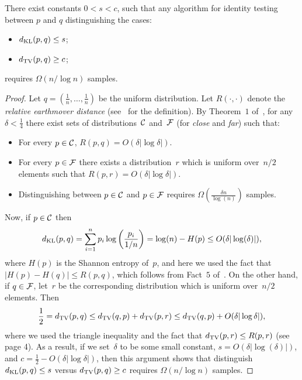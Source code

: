 \begin{theorem}\label{thm:ones-lb}
There exist constants $0 < s < c$, such that any algorithm for identity testing between $p$ and $q$ distinguishing the cases:
\begin{itemize}
\item $d_{\mathrm {KL}}(p,q) \leq s$;
\item $d_{\mathrm {TV}}(p,q) \geq c$;
\end{itemize}
requires $\Omega(n/\log n)$ samples.
\end{theorem}
\begin{proof}
Let $q = (\tfrac{1}{n}, \ldots, \tfrac{1}{n})$ be the uniform distribution.
Let $R(\cdot, \cdot)$ denote the \emph{relative earthmover distance} (see~\cite{ValiantV10a} for the definition).
By Theorem~$1$ of~\cite{ValiantV10a},
for any $\delta < \frac{1}{4}$
there exist sets of distributions~$\mathcal{C}$ and~$\mathcal{F}$ (for \emph{close} and \emph{far})
such that:
\begin{itemize}
\item For every $p \in \mathcal{C}$, $R(p, q) = O(\delta | \log \delta|)$.
\item For every $p \in \mathcal{F}$ there exists a distribution~$r$ which is uniform over~$n/2$ elements such that $R(p, r) = O(\delta | \log \delta|)$.
\item Distinguishing between $p \in \mathcal{C}$ and $p \in \mathcal{F}$ requires $\Omega(\frac{\delta n}{\log(n)})$ samples.
\end{itemize}
Now, if $p \in \mathcal{C}$ then
\begin{equation*}
d_{\mathrm {KL}}(p,q)
= \sum_{i=1}^n p_i \log\left(\frac{p_i}{1/n}\right)
= \log(n) - H(p)
\leq O(\delta |\log(\delta)|),
\end{equation*}
where $H(p)$ is the Shannon entropy of~$p$,
and here we used the fact that $|H(p) - H(q)| \leq R(p, q)$, which follows from Fact~$5$ of~\cite{ValiantV10a}.
On the other hand, if $q \in \mathcal{F}$, let~$r$ be the corresponding distribution which is uniform over~$n/2$ elements.
Then
\begin{equation*}
\frac{1}{2}
= d_{\mathrm {TV}}(p,q)
\leq d_{\mathrm {TV}}(q,p) + d_{\mathrm {TV}}(p,r)
\leq d_{\mathrm {TV}}(q,p) + O(\delta | \log \delta|),
\end{equation*}
where we used the triangle inequality
and the fact that $d_{\mathrm {TV}}(p,r) \leq R(p, r)$ (see~\cite{ValiantV10a} page 4).
As a result, if we set~$\delta$ to be some small constant,
$s = O(\delta |\log(\delta)|)$,
and $c = \frac{1}{2} - O(\delta | \log\delta|)$,
then this argument shows that distinguish $d_{\mathrm {KL}}(p,q) \leq s$ versus $d_{\mathrm {TV}}(p,q) \geq c$
requires $\Omega(n/\log n)$ samples.
\end{proof}

